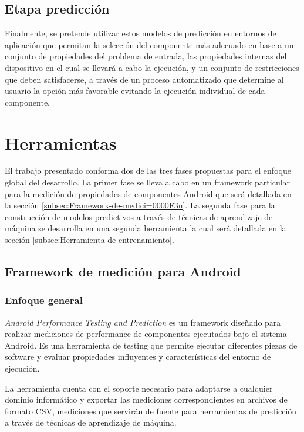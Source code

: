 \subsection{Etapa predicción }

Finalmente, se pretende utilizar estos modelos de predicción en entornos
de aplicación que permitan la selección del componente más adecuado
en base a un conjunto de propiedades del problema de entrada, las
propiedades internas del dispositivo en el cual se llevará a cabo
la ejecución, y un conjunto de restricciones que deben satisfacerse,
a través de un proceso automatizado que determine al usuario la opción
más favorable evitando la ejecución individual de cada componente. 


\section{Herramientas\label{sec:Herramientas}}

El trabajo presentado conforma dos de las tres fases propuestas para
el enfoque global del desarrollo. La primer fase se lleva a cabo en
un framework particular para la medición de propiedades de componentes
Android que será detallada en la sección \ref{subsec:Framework-de-medici=0000F3n}.
La segunda fase para la construcción de modelos predictivos a través
de técnicas de aprendizaje de máquina se desarrolla en una segunda
herramienta la cual será detallada en la sección \ref{subsec:Herramienta-de-entrenamiento}. 


\subsection{Framework de medición para Android\label{subsec:Framework-de-medici=0000F3n}}


\subsubsection*{Enfoque general}

\emph{Android Performance Testing and Prediction} es un framework
diseñado para realizar mediciones de performance de componentes ejecutados
bajo el sistema Android. Es una herramienta de testing que permite
ejecutar diferentes piezas de software y evaluar propiedades influyentes
y características del entorno de ejecución. 

La herramienta cuenta con el soporte necesario para adaptarse a cualquier
dominio informático y exportar las mediciones correspondientes en
archivos de formato \ac{CSV}, mediciones que servirán de fuente para
herramientas de predicción a través de técnicas de aprendizaje de
máquina. 


